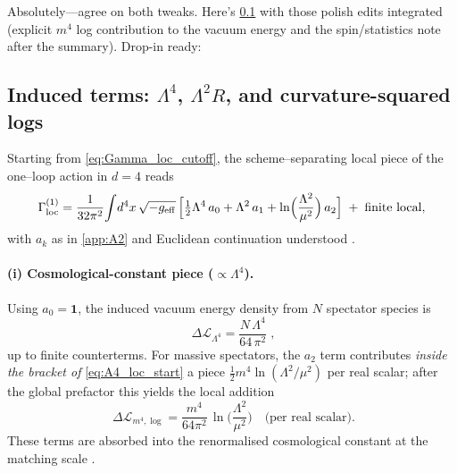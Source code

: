 \documentclass{iopjournal}
\begin{document}
Absolutely—agree on both tweaks. Here's \cref{app:A4} with those polish edits integrated (explicit $m^4$ log contribution to the vacuum energy and the spin/statistics note after the summary). Drop-in ready:


\subsection{\texorpdfstring{Induced terms: $\Lambda^4$, $\Lambda^2 R$, and curvature-squared logs}{Induced terms: Lambda4, Lambda2 R, and curvature-squared logs}}\label{app:A4}



Starting from \eqref{eq:Gamma_loc_cutoff}, the scheme–separating local piece of the one–loop action in $d=4$ reads
\begin{equation}
\Gamma^{(1)}_{\rm loc}
=\frac{1}{32\pi^2}\!\int\! d^4x\,\sqrt{-g_{\rm eff}}\,
\Big[\tfrac{1}{2}\Lambda^4\,a_0+\Lambda^2\,a_1
+\ln\!\Big(\frac{\Lambda^2}{\mu^2}\Big)\,a_2\Big]
\;+\;\text{finite local},
\label{eq:A4_loc_start}
\end{equation}
with $a_k$ as in \cref{app:A2} and Euclidean continuation understood \cite{DeWitt1965,ParkerToms,Vassilevich2003,Avramidi2000}.

\paragraph{(i) Cosmological-constant piece ($\propto \Lambda^4$).}
Using $a_0=\mathbf{1}$, the induced vacuum energy density from $N$ spectator species is
\begin{equation}
\boxed{\;
\Delta\mathcal{L}_{\Lambda^4}
=\frac{N\,\Lambda^4}{64\,\pi^2}
\;}\!,
\label{eq:A4_CC}
\end{equation}
up to finite counterterms. For massive spectators, the $a_2$ term contributes \emph{inside the bracket of} \eqref{eq:A4_loc_start} a piece $\tfrac{1}{2}m^4\ln(\Lambda^2/\mu^2)$ per real scalar; after the global prefactor this yields the local addition
\begin{equation}
\boxed{\;
\Delta\mathcal L_{m^4,\log}
=\frac{m^4}{64\pi^2}\,\ln\!\Big(\frac{\Lambda^2}{\mu^2}\Big)
\quad \text{(per real scalar).}
}
\label{eq:A4_m4log}
\end{equation}
These terms are absorbed into the renormalised cosmological constant at the matching scale \cite{ParkerToms}.
\end{document}

